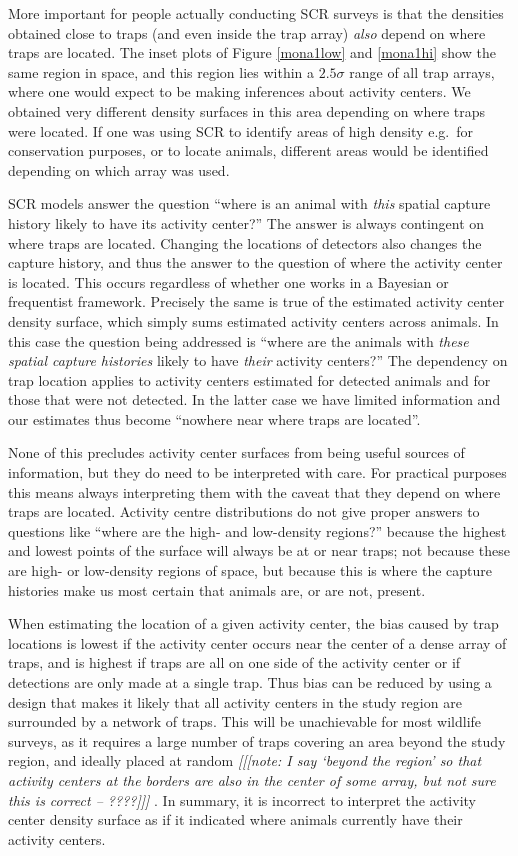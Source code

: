 \documentclass[a4paper,12pt]{article}
\begin{document}
More important for people actually conducting SCR surveys is that the densities obtained close to traps (and even inside the trap array) {\it also} depend on where traps are located. The inset plots of Figure \ref{mona1low} and \ref{mona1hi} show the same region in space, and this region lies within a $2.5\sigma$ range of all trap arrays, where one would expect to be making inferences about activity centers. We obtained very different density surfaces in this area depending on where traps were located. If one was using SCR to identify areas of high density e.g.\ for conservation purposes, or to locate animals, different areas would be identified depending on which array was used. 

SCR models answer the question ``where is an animal with {\it this} spatial capture history likely to have its activity center?'' The answer is always contingent on where traps are located. Changing the locations of detectors also changes the capture history, and thus the answer to the question of where the activity center is located. This occurs regardless of whether one works in a Bayesian or frequentist framework. Precisely the same is true of the estimated activity center density surface, which simply sums estimated activity centers across animals. In this case the question being addressed is ``where are the animals with {\it these spatial capture histories} likely to have {\it their} activity centers?'' The dependency on trap location applies to activity centers estimated for detected animals and for those that were not detected. In the latter case we have limited information and our estimates thus become ``nowhere near where traps are located''. 

None of this precludes activity center surfaces from being useful sources of information, but they do need to be interpreted with care. For practical purposes this means always interpreting them with the caveat that they depend on where traps are located. Activity centre distributions do not give proper answers to questions like ``where are the high- and low-density regions?'' because the highest and lowest points of the surface will always be at or near traps; not because these are high- or low-density regions of space, but because this is where the capture histories make us most certain that animals are, or are not, present. 

When estimating the location of a given activity center, the bias caused by trap locations is lowest if the activity center occurs near the center of a dense array of traps, and is highest if traps are all on one side of the activity center or if detections are only made at a single trap. Thus bias can be reduced by using a design that makes it likely that all activity centers in the study region are surrounded by a network of traps. This will be unachievable for most wildlife surveys, as it requires a large number of traps covering an area beyond the study region, and ideally placed at random {\it [[[note: I say `beyond the region' so that activity centers at the borders are also in the center of some array, but not sure this is correct -- ????]]]} . In summary, it is incorrect to interpret the activity center density surface as if it indicated where animals currently have their activity centers. 
\end{document}
